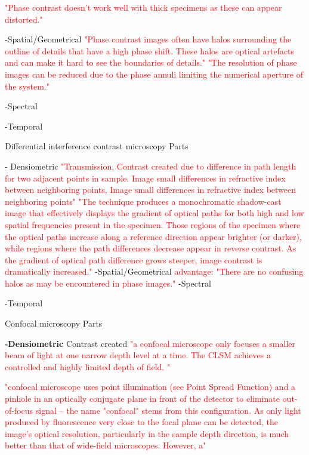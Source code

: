 	\textcolor{red}{"Phase contrast doesn't work well with thick specimens as these can appear distorted."} 

	-Spatial/Geometrical 
	\textcolor{red}{"Phase contrast images often have halos surrounding the outline of details that have a high phase shift. These halos are optical artefacts and can make it hard to see the boundaries of details."} 
	\textcolor{red}{"The resolution of phase images can be reduced due to the phase annuli limiting the numerical aperture of the system."}  


	-Spectral

	-Temporal



Differential interference contrast microscopy
	Parts

	- Densiometric
	\textcolor{red}{"Transmission, Contrast created due to difference in path length for two adjacent points in sample. Image small differences in refractive index between neighboring points, Image small differences in refractive index between neighboring points"} 
	\textcolor{red}{"The technique produces a monochromatic shadow-cast image that effectively displays the gradient of optical paths for both high and low spatial frequencies present in the specimen. Those regions of the specimen where the optical paths increase along a reference direction appear brighter (or darker), while regions where the path differences decrease appear in reverse contrast. As the gradient of optical path difference grows steeper, image contrast is dramatically increased."} 
	-Spatial/Geometrical 
	\textcolor{red}{advantage: "There are no confusing halos as may be encountered in phase images."} 
	-Spectral

	-Temporal



Confocal microscopy
	Parts

	\textbf{-Densiometric}
	Contrast created 
	\textcolor{red}{"a confocal microscope only focuses a smaller beam of light at one narrow depth level at a time. The CLSM achieves a controlled and highly limited depth of field. "} 

	\textcolor{red}{"confocal microscope uses point illumination (see Point Spread Function) and a pinhole in an optically conjugate plane in front of the detector to eliminate out-of-focus signal – the name "confocal" stems from this configuration. As only light produced by fluorescence very close to the focal plane can be detected, the image's optical resolution, particularly in the sample depth direction, is much better than that of wide-field microscopes. However, a"} 

